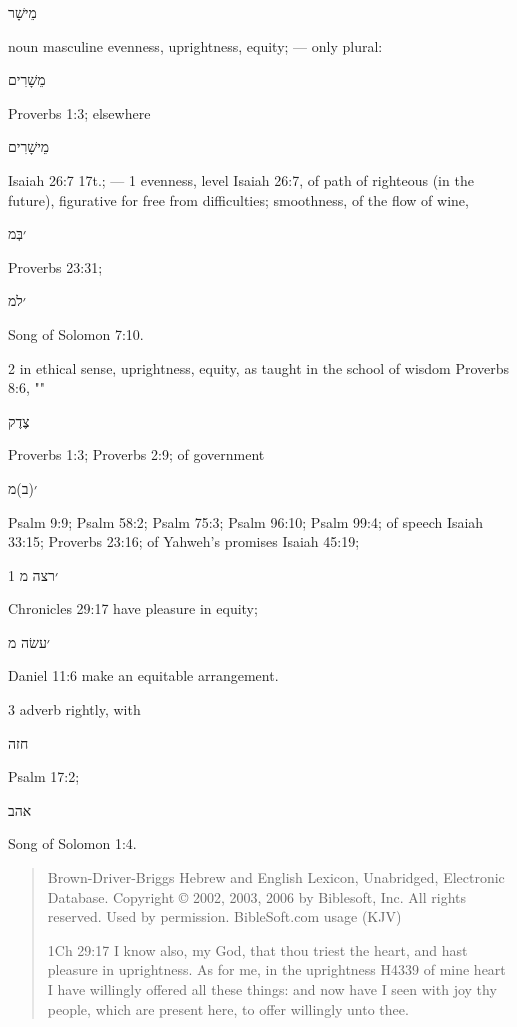 \documentclass[11pt]{article}
\begin{document}
\begin{thebibliography}{37}
\begin{hebrew} מֵישָׁר \end{hebrew} noun masculine evenness, uprightness, equity; — only plural: \begin{hebrew} מֵשָׁרִים \end{hebrew}  Proverbs 1:3; elsewhere \begin{hebrew} מֵישָׁרִים \end{hebrew} Isaiah  26:7 17t.; —
1 evenness, level Isaiah 26:7, of path of righteous (in the future), figurative for free from difficulties; smoothness, of the flow of wine, \begin{hebrew} ׳בְּמ \end{hebrew} Proverbs 23:31; \begin{hebrew} ׳למ \end{hebrew} Song of Solomon 7:10.

2 in ethical sense, uprightness, equity, as taught in the school of wisdom Proverbs 8:6, "" \begin{hebrew} צֶדֶק \end{hebrew} Proverbs 1:3; Proverbs 2:9; of government \begin{hebrew} ׳(ב)מ \end{hebrew} Psalm 9:9; Psalm 58:2; Psalm 75:3; Psalm 96:10; Psalm 99:4; of speech Isaiah 33:15; Proverbs 23:16; of Yahweh's promises Isaiah 45:19; \begin{hebrew} ׳רצה מ  1 \end{hebrew} Chronicles 29:17 have pleasure in equity; \begin{hebrew} ׳עשׂה מ \end{hebrew} Daniel 11:6 make an equitable arrangement.

3 adverb rightly, with \begin{hebrew} חזה \end{hebrew} Psalm 17:2; \begin{hebrew} אהב \end{hebrew} Song of Solomon 1:4.
\begin{quote}
Brown-Driver-Briggs Hebrew and English Lexicon, Unabridged, Electronic Database.
Copyright © 2002, 2003, 2006 by Biblesoft, Inc. 
All rights reserved. Used by permission. BibleSoft.com
usage (KJV)

1Ch 29:17
I know also, my God, that thou triest the heart, and hast pleasure in uprightness. As for me, in the uprightness H4339 of mine heart I have willingly offered all these things: and now have I seen with joy thy people, which are present here, to offer willingly unto thee.


\end{quote}
\end{thebibliography}
\end{document}
